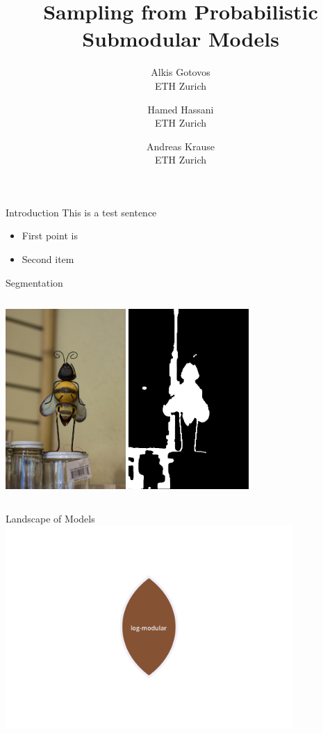 \documentclass[mathserif]{beamer}
\title[Sampling from Probabilistic Submodular Models]
{Sampling from Probabilistic Submodular Models}
\author[Alkis Gotovos]{
\vspace{1in}
\normalsize
\parbox{1in}{Alkis Gotovos\\{\footnotesize ETH Zurich}}\and
\parbox{1in}{Hamed Hassani\\{\footnotesize ETH Zurich}}\and
\parbox{1in}{Andreas Krause\\{\footnotesize ETH Zurich}}
}
\begin{document}


\begin{frame}{Introduction}
This is a test sentence

\begin{itemize}
\item First point is
\item Second item
\end{itemize}
\end{frame}

\begin{frame}{Segmentation}
\begin{columns}[c]
\centering
\includegraphics[width=1.8in]{figures/bee.jpg}
\centering
\includegraphics[width=1.8in]{figures/bee_fbp1.png}
\end{columns}
\end{frame}

\begin{frame}{Landscape of Models}
\centering
\includegraphics[width=4.3in]{figures/venn01.pdf}
\end{frame}
\end{document}
